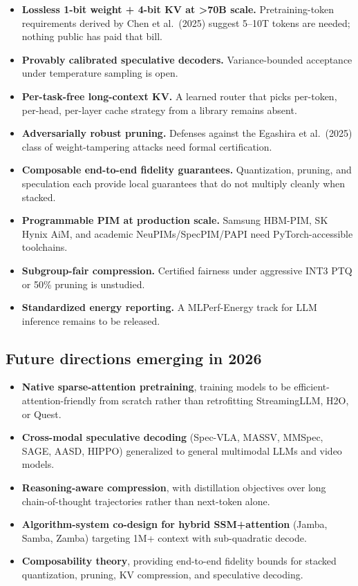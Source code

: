 \begin{itemize}
\tightlist
\item
  \textbf{Lossless 1-bit weight + 4-bit KV at \textgreater70B scale.} Pretraining-token requirements derived by Chen et al.~(2025) suggest 5--10T tokens are needed; nothing public has paid that bill.
\item
  \textbf{Provably calibrated speculative decoders.} Variance-bounded acceptance under temperature sampling is open.
\item
  \textbf{Per-task-free long-context KV.} A learned router that picks per-token, per-head, per-layer cache strategy from a library remains absent.
\item
  \textbf{Adversarially robust pruning.} Defenses against the Egashira et al.~(2025) class of weight-tampering attacks need formal certification.
\item
  \textbf{Composable end-to-end fidelity guarantees.} Quantization, pruning, and speculation each provide local guarantees that do not multiply cleanly when stacked.
\item
  \textbf{Programmable PIM at production scale.} Samsung HBM-PIM, SK Hynix AiM, and academic NeuPIMs/SpecPIM/PAPI need PyTorch-accessible toolchains.
\item
  \textbf{Subgroup-fair compression.} Certified fairness under aggressive INT3 PTQ or 50\% pruning is unstudied.
\item
  \textbf{Standardized energy reporting.} A MLPerf-Energy track for LLM inference remains to be released.
\end{itemize}

\subsection{Future directions emerging in 2026}\label{future-directions-emerging-in-2026}

\begin{itemize}
\tightlist
\item
  \textbf{Native sparse-attention pretraining}, training models to be efficient-attention-friendly from scratch rather than retrofitting StreamingLLM, H2O, or Quest.
\item
  \textbf{Cross-modal speculative decoding} (Spec-VLA, MASSV, MMSpec, SAGE, AASD, HIPPO) generalized to general multimodal LLMs and video models.
\item
  \textbf{Reasoning-aware compression}, with distillation objectives over long chain-of-thought trajectories rather than next-token alone.
\item
  \textbf{Algorithm-system co-design for hybrid SSM+attention} (Jamba, Samba, Zamba) targeting 1M+ context with sub-quadratic decode.
\item
  \textbf{Composability theory}, providing end-to-end fidelity bounds for stacked quantization, pruning, KV compression, and speculative decoding.
\end{itemize}

